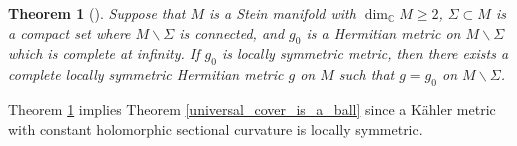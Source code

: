 \documentclass[12pt] {article}
\newtheorem{theorem}{Theorem}[section]
\numberwithin{equation}{section}
\begin{document}
\medskip

 
 



\begin{theorem}[\cite{GZ}] \label{locally symmetric}
Suppose that $M$ is a Stein manifold with $\dim_{\mathbb{C}} M \geq 2$,
$\Sigma \subset M$ is a compact set where $M \backslash \Sigma$ is connected, and $g_0$ is a Hermitian metric on $M \backslash \Sigma$ which is complete at infinity.  If $g_0$ is locally symmetric metric, then there
exists a  complete locally symmetric Hermitian metric $g$ on $M$ such that $g = g_0$ on $M \backslash \Sigma$.
 \end{theorem}


\medskip



Theorem \ref{locally symmetric} implies Theorem \ref{universal_cover_is_a_ball} since a K\"ahler metric with constant holomorphic sectional curvature is locally symmetric.


  
 
\medskip

 
 

  \medskip

 
 
\end{document}
